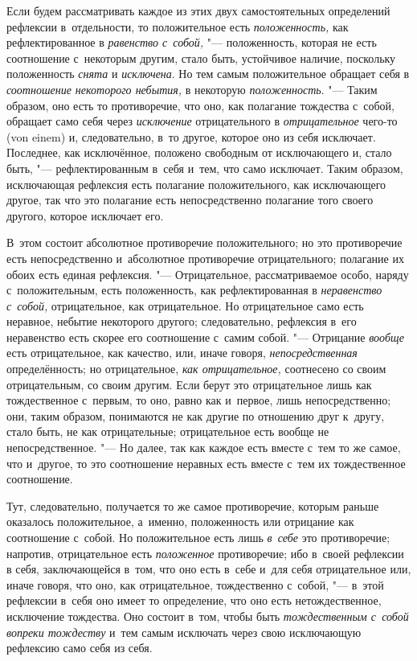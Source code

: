 Если будем рассматривать каждое из этих двух самостоятельных определений
рефлексии в~отдельности, то положительное есть
{\em положенность,} как рефлектированное в
{\em равенство с~собой,} "--- положенность, которая не
есть соотношение с~некоторым другим, стало быть, устойчивое наличие,
поскольку положенность {\em снята} и
{\em исключена}. Но тем самым положительное обращает
себя в {\em соотношение некоторого небытия,} в
некоторую {\em положенность}. "--- Таким образом, оно есть
то противоречие, что оно, как полагание тождества с~собой, обращает само
себя через {\em исключение} отрицательного в
{\em отрицательное} чего-то (von einem) и,
следовательно, в~то другое, которое оно из себя исключает. Последнее, как
исключённое, положено свободным от исключающего и, стало быть, "---
рефлектированным в~себя и~тем, что само исключает. Таким образом,
исключающая рефлексия есть полагание положительного, как исключающего
другое, так что это полагание есть непосредственно полагание того своего
другого, которое исключает его.

В~этом состоит абсолютное противоречие положительного; но это противоречие
есть непосредственно и~абсолютное противоречие отрицательного; полагание их
обоих есть единая рефлексия. "--- Отрицательное, рассматриваемое особо, наряду
с~положительным, есть положенность, как рефлектированная в
{\em неравенство с~собой,} отрицательное, как
отрицательное. Но отрицательное само есть неравное, небытие некоторого
другого; следовательно, рефлексия в~его неравенство есть скорее его
соотношение с~самим собой. "--- Отрицание {\em вообще}
есть отрицательное, как качество, или, иначе говоря,
{\em непосредственная} определённость; но
отрицательное, {\em как отрицательное,} соотнесено со
своим отрицательным, со своим другим. Если берут это отрицательное лишь как
тождественное с~первым, то оно, равно как и~первое, лишь непосредственно;
они, таким образом, понимаются не как другие по отношению друг к~другу,
стало быть, не как отрицательные; отрицательное есть вообще не
непосредственное. "--- Но далее, так как каждое есть вместе с~тем то же самое,
что и~другое, то это соотношение неравных есть вместе с~тем их
тождественное соотношение.

Тут, следовательно, получается то же самое противоречие, которым раньше
оказалось положительное, а~именно, положенность или отрицание как
соотношение с~собой. Но положительное есть лишь {\em в~себе} это
противоречие; напротив, отрицательное есть
{\em положенное} противоречие; ибо в~своей рефлексии в
себя, заключающейся в~том, что оно есть в~себе и~для себя отрицательное
или, иначе говоря, что оно, как отрицательное, тождественно
с~собой, "--- в~этой рефлексии в~себя оно имеет то определение, что оно есть
нетождественное, исключение тождества. Оно состоит в~том, чтобы быть
{\em тождественным с~собой вопреки тождеству} и~тем
самым исключать через свою исключающую рефлексию само себя из себя.

